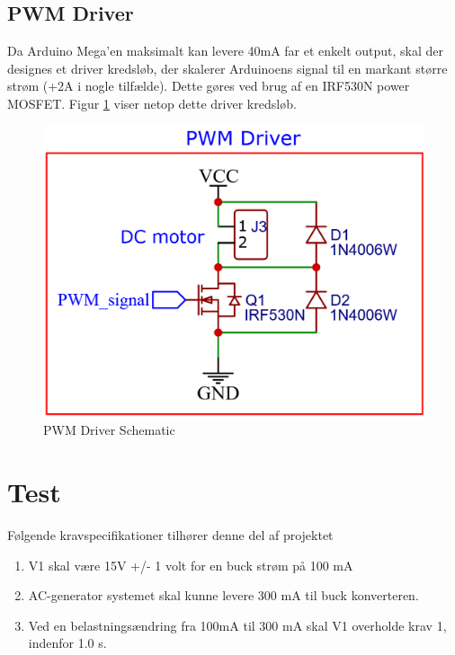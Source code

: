 \documentclass[../main.tex]{subfiles}
\begin{document}
\subsection{PWM Driver}
Da Arduino Mega'en maksimalt kan levere 40mA far et enkelt output, skal der designes et driver kredsløb, der skalerer Arduinoens signal til en markant større strøm (+2A i nogle tilfælde). Dette gøres ved brug af en IRF530N power MOSFET. Figur \ref{fig: PWM Driver Schematic} viser netop dette driver kredsløb.
\begin{figure}[H]
      \includegraphics[width=\textwidth]{Dokumentation/Figures/PWM_Driver.png}
     \caption{PWM Driver Schematic}
     \label{fig: PWM Driver Schematic}
     \end{figure}


\section{Test}
Følgende kravspecifikationer tilhører denne del af projektet
\begin{enumerate}
  \item V1 skal være 15V +/- 1 volt for en buck strøm på 100 mA
  \item AC-generator systemet skal kunne levere 300 mA til buck konverteren.
  \item Ved en belastningsændring fra 100mA til 300 mA skal V1 overholde krav 1, indenfor 1.0 s.
\end{enumerate}
\end{document}
